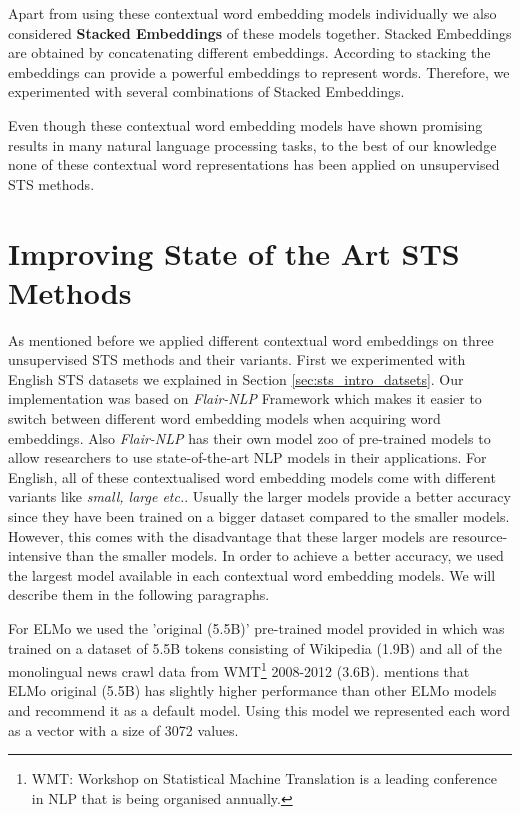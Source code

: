 Apart from using these contextual word embedding models individually we also considered \textbf{Stacked Embeddings} of these models together. Stacked Embeddings are obtained by concatenating different embeddings. According to \citet{akbik-etal-2018-contextual} stacking the embeddings can provide a powerful embeddings to represent words. Therefore, we experimented with several combinations of Stacked Embeddings.

Even though these contextual word embedding models have shown promising results in many natural language processing tasks, to the best of our knowledge none of these contextual word representations has been applied on unsupervised STS methods.  



\section{Improving State of the Art STS Methods}
\label{sec:state_method}
As mentioned before we applied different contextual word embeddings on three unsupervised STS methods and their variants. First we experimented with English STS datasets we explained in Section \ref{sec:sts_intro_datsets}. Our implementation was based on \textit{Flair-NLP} Framework \cite{akbik-etal-2019-flair} which makes it easier to switch between different word embedding models when acquiring word embeddings. Also \textit{Flair-NLP} has their own model zoo of pre-trained models to allow researchers to use state-of-the-art NLP models in their applications. For English, all of these contextualised word embedding models come with different variants like \textit{small, large etc.}. Usually the larger models provide a better accuracy since they have been trained on a bigger dataset compared to the smaller models. However, this comes with the disadvantage that these larger models are resource-intensive than the smaller models. In order to achieve a better accuracy, we used the largest model available in each contextual word embedding models. We will describe them in the following paragraphs. 

For ELMo we used the 'original (5.5B)' pre-trained model provided in \citet{peters-etal-2018-deep} which was trained on a dataset of 5.5B tokens consisting of Wikipedia (1.9B) and all of the monolingual news crawl data from WMT\footnote{WMT: Workshop on Statistical Machine Translation is a leading conference in NLP that is being organised annually.} 2008-2012 (3.6B). \citet{peters-etal-2018-deep} mentions that ELMo original (5.5B) has slightly higher performance than other ELMo models and recommend it as a default model. Using this model we represented each word as a vector with a size of 3072 values.

